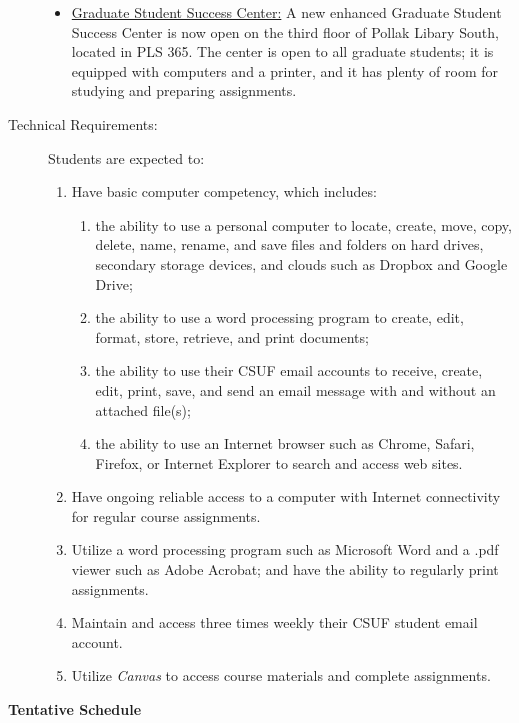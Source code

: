 \documentclass[11pt]{article}
\begin{document}
\begin{description}
\begin{itemize}
		\item \underline{Graduate Student Success Center:} A new enhanced Graduate Student Success Center is now open on the third floor of Pollak Libary South, located in PLS 365. The center is open to all graduate students; it is equipped with computers and a printer, and it has plenty of room for studying and preparing assignments. 
	\end{itemize}
	
	\item[Technical Requirements:] Students are expected to: 
	\begin{enumerate}
		\item Have basic computer competency, which includes: 
		\begin{enumerate}
			\item the ability to use a personal computer to locate, create, move, copy, delete, name, rename, and save files and folders on hard drives, secondary storage devices, and clouds such as Dropbox and Google Drive; 
			\item the ability to use a word processing program to create, edit, format, store, retrieve, and print documents; 
			\item the ability to use their CSUF email accounts to receive, create, edit, print, save, and send an email message with and without an attached file(s); 
			\item the ability to use an Internet browser such as Chrome, Safari, Firefox, or Internet Explorer to search and access web sites. 
		\end{enumerate}
		\item Have ongoing reliable access to a computer with Internet connectivity for regular course assignments. 
		\item Utilize a word processing program such as Microsoft Word and a .pdf viewer such as Adobe Acrobat; and have the ability to regularly print assignments. 
		\item Maintain and access three times weekly their CSUF student email account. 
		\item Utilize \emph{Canvas} to access course materials and complete assignments. 
	\end{enumerate}
\end{description}

\vspace{1cm}

\begin{center}
	\begin{Large}
		\textbf{Tentative  Schedule} 
	\end{Large}
\end{center}
\end{document}
